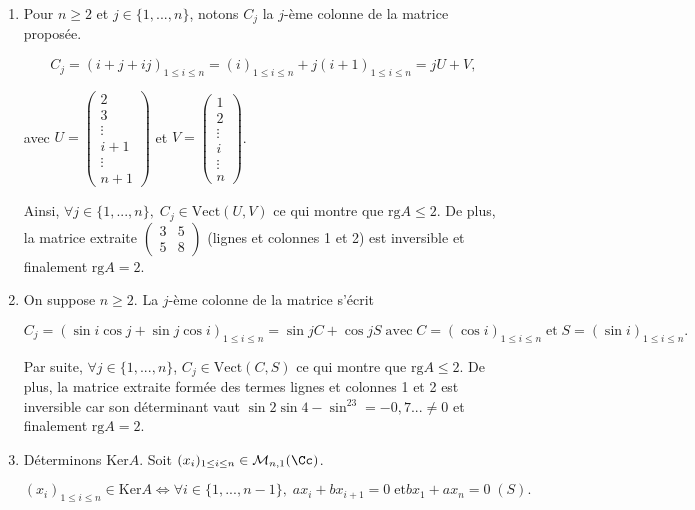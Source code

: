 {{\begin{enumerate}
\begin{itemize}
Si $a=b=\pm1$, $\mbox{rg}A=1$ et si $a=b\neq\pm1$, $\mbox{rg}A=2$.
\end{itemize}

\item  Pour $n\geq2$ et $j\in\{1,...,n\}$, notons $C_j$ la $j$-ème colonne de la matrice proposée.

$$C_j=(i+j+ij)_{1\leq i\leq n}=(i)_{1\leq i\leq n}+j(i+1)_{1\leq i\leq n}=jU+V,$$

avec $U=\left(\begin{array}{c}
2\\
3\\
\vdots\\
i+1\\
\vdots\\
n+1
\end{array}
\right)$ 
et $V=\left(\begin{array}{c}
1\\
2\\
\vdots\\
i\\
\vdots\\
n
\end{array}
\right)$.

Ainsi, $\forall j\in\{1,...,n\},\;C_j\in\mbox{Vect}(U,V)$ ce qui montre que $\mbox{rg}A\leq2$.
De plus, la matrice extraite $\left(
\begin{array}{cc}
3&5\\
5&8
\end{array}
\right)$ (lignes et colonnes 1 et 2) est inversible et finalement $\mbox{rg}A=2$.

\item  On suppose $n\geq2$. La $j$-ème colonne de la matrice s'écrit

$$C_j=(\sin i\cos j+\sin j\cos i)_{1\leq i\leq n}=\sin jC+\cos jS\;\mbox{avec}\;C=(\cos i)_{1\leq i\leq n}\;\mbox{et}\;S=(\sin i)_{1\leq i\leq n}.$$

Par suite, $\forall j\in\{1,...,n\}$, $C_j\in\mbox{Vect}(C,S)$ ce qui montre que $\mbox{rg}A\leq2$. De plus, la matrice extraite formée des termes lignes et colonnes 1 et 2 est inversible car son déterminant vaut
$\sin2\sin4-\sin^23=-0,7...\neq0$ et finalement $\mbox{rg}A=2$.

\item  Déterminons $\mbox{Ker}A$. Soit $(x_i)_{1\leq i\leq n}\in\mathcal{M}_{n,1}(\Cc)$.

$$(x_i)_{1\leq i\leq n}\in\mbox{Ker}A\Leftrightarrow\forall i\in\{1,...,n-1\},\;ax_i+bx_{i+1}=0\;\mbox{et}bx_1+ax_n=0\;(S).$$


\end{enumerate}}}
